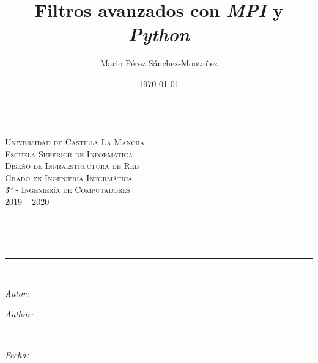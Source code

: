 \documentclass[11pt]{article}
\title{Filtros avanzados con \textit{MPI} y \textit{Python}}							%
\author{Mario Pérez Sánchez-Montañez}							%
\date{\today}											%
\makeatletter
\newif\ifspanish %
\newif\ifmultipleauthors %
\newcommand{\subject}{Diseño de Infraestructura de Red}						%
\newcommand{\course}{Grado en Ingeniería Informática \\ 3º - Ingeniería de Computadores}	%
\newcommand{\courseyear}{2019 -- 2020} 					%
\newcommand{\dateText}{Fecha:}
\newcommand{\dateText}{Date:}
\let\thetitle\@title
\let\theauthor\@author
\let\thedate\@date
\makeatother
\begin{document}

\begin{titlepage}
	\centering
	\begin{minipage}[t]{\textwidth}
		\hspace{\fill}
	\end{minipage}
	\\[2.25 cm]
    \textsc{\LARGE Universidad de Castilla-La Mancha}\\[0.5 cm]	%
    \textsc{\LARGE Escuela Superior de Informática}\\[2.0 cm]
	\textsc{\Large \subject}\\[0.5 cm]				%
	\textsc{\large \course \\ \courseyear}\\[2 cm]				%
	\rule{\linewidth}{0.2 mm} \\[0.4 cm]
	{ \huge \bfseries \thetitle}\\
	\rule{\linewidth}{0.2 mm} \\[2.5 cm]

	\vspace*{\fill}
	\begin{minipage}{0.4\textwidth}
		\begin{flushleft} \large
			\ifspanish
				\ifmultipleauthors
					\emph{Autores:}\\
				\else
					\emph{Autor:}\\
				\fi
			\else
				\ifmultipleauthors
					\emph{Authors:}\\
				\else
					\emph{Author:}\\
				\fi
			\fi
			\theauthor
			\end{flushleft}
			\end{minipage}~
			\begin{minipage}{0.4\textwidth}
			\begin{flushright} \large
			\emph{\dateText} \\
			\thedate
		\end{flushright}
	\end{minipage}\\[2.25 cm]


\end{titlepage}

\end{document}
